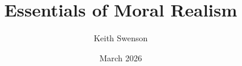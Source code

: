 


\makeatletter
{}
\makeatother
\title{Essentials of Moral Realism}
\author{Keith Swenson}
\date{March 2026}



\frontmatter

\maketitle

\tableofcontents
\clearpage




\mainmatter












\appendix





\backmatter

\providecommand{\phantomsection}{}
\cleardoublepage
\phantomsection
{}
\printindex


